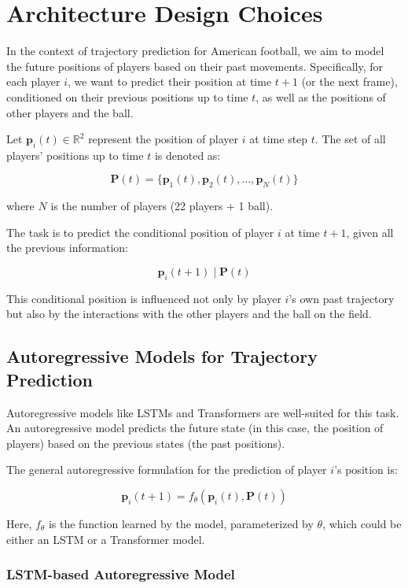 \documentclass[sigconf]{acmart}
\begin{document}
\section{Architecture Design Choices}

In the context of trajectory prediction for American football, we aim to model the future positions of players based on their past movements. Specifically, for each player $i$, we want to predict their position at time $t+1$ (or the next frame), conditioned on their previous positions up to time $t$, as well as the positions of other players and the ball.

Let $\mathbf{p}_i(t) \in \mathbb{R}^2$ represent the position of player $i$ at time step $t$. The set of all players' positions up to time $t$ is denoted as:

\[
\mathbf{P}(t) = \{ \mathbf{p}_1(t), \mathbf{p}_2(t), \dots, \mathbf{p}_N(t) \}
\]

where $N$ is the number of players (22 players + 1 ball).

The task is to predict the conditional position of player $i$ at time $t+1$, given all the previous information:

\[
\mathbf{p}_i(t+1) \mid \mathbf{P}(t)
\]

This conditional position is influenced not only by player $i$’s own past trajectory but also by the interactions with the other players and the ball on the field.

\subsection{Autoregressive Models for Trajectory Prediction}

Autoregressive models like LSTMs and Transformers are well-suited for this task. An autoregressive model predicts the future state (in this case, the position of players) based on the previous states (the past positions).

The general autoregressive formulation for the prediction of player $i$’s position is:

\[
\mathbf{p}_i(t+1) = f_{\theta} \left( \mathbf{p}_i(t), \mathbf{P}(t) \right)
\]

Here, $f_{\theta}$ is the function learned by the model, parameterized by $\theta$, which could be either an LSTM or a Transformer model.

\subsubsection{LSTM-based Autoregressive Model}
\end{document}
